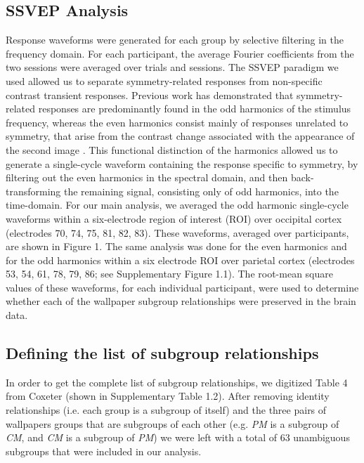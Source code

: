 \documentclass[9pt,twocolumn,twoside,lineno]{pnas-new}
\begin{document}
\subsection*{SSVEP Analysis}
Response waveforms were generated for each group by selective filtering in the frequency domain. For each participant, the average Fourier coefficients from the two sessions were averaged over trials and sessions. The SSVEP paradigm we used allowed us to separate symmetry-related responses from non-specific contrast transient responses. Previous work has demonstrated that symmetry-related responses are predominantly found in the odd harmonics of the stimulus frequency, whereas the even harmonics consist mainly of responses unrelated to symmetry, that arise from the contrast change associated with the appearance of the second image \cite{RN1954, RN1725}. This functional distinction of the harmonics allowed us to generate a single-cycle waveform containing the response specific to symmetry, by filtering out the even harmonics in the spectral domain, and then back-transforming the remaining signal, consisting only of odd harmonics, into the time-domain. For our main analysis, we averaged the odd harmonic single-cycle waveforms within a six-electrode region of interest (ROI) over occipital cortex (electrodes 70, 74, 75, 81, 82, 83). These waveforms, averaged over participants, are shown in Figure 1. The same analysis was done for the even harmonics and for the odd harmonics within a six electrode ROI over parietal cortex (electrodes 53, 54, 61, 78, 79, 86; see Supplementary Figure 1.1). The root-mean square values of these waveforms, for each individual participant, were used to determine whether each of the wallpaper subgroup relationships were preserved in the brain data.  

\subsection*{Defining the list of subgroup relationships}
In order to get the complete list of subgroup relationships, we digitized Table 4 from Coxeter \cite{RN1711} (shown in Supplementary Table 1.2). After removing identity relationships (i.e. each group is a subgroup of itself) and the three pairs of wallpapers groups that are subgroups of each other (e.g. \textit{PM} is a subgroup of \textit{CM}, and \textit{CM} is a subgroup of \textit{PM}) we were left with a total of 63 unambiguous subgroups that were included in our analysis. 
\end{document}

